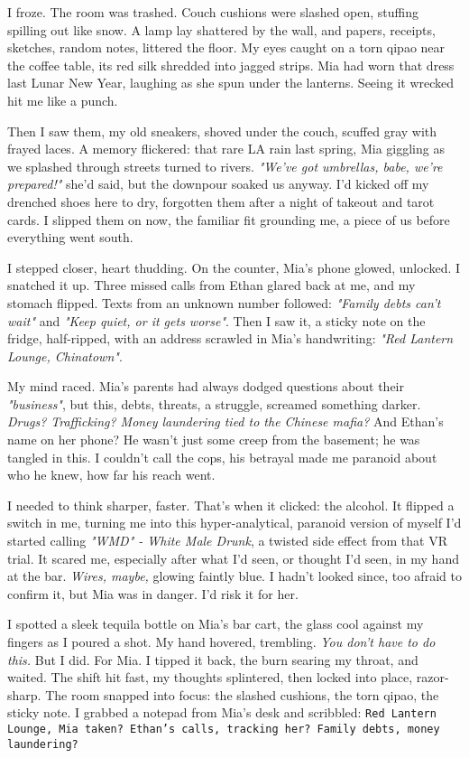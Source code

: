 \documentclass[12pt,oneside]{book}
\newcommand{\note}[1]{\texttt{#1}}
\begin{document}
I froze. The room was trashed. Couch cushions were slashed open, stuffing spilling out like snow. A lamp lay shattered by the wall, and papers, receipts, sketches, random notes, littered the floor. My eyes caught on a torn qipao near the coffee table, its red silk shredded into jagged strips. Mia had worn that dress last Lunar New Year, laughing as she spun under the lanterns. Seeing it wrecked hit me like a punch.

Then I saw them, my old sneakers, shoved under the couch, scuffed gray with frayed laces. A memory flickered: that rare LA rain last spring, Mia giggling as we splashed through streets turned to rivers. \textit{"We’ve got umbrellas, babe, we’re prepared!"} she’d said, but the downpour soaked us anyway. I’d kicked off my drenched shoes here to dry, forgotten them after a night of takeout and tarot cards. I slipped them on now, the familiar fit grounding me, a piece of us before everything went south.

I stepped closer, heart thudding. On the counter, Mia’s phone glowed, unlocked. I snatched it up. Three missed calls from Ethan glared back at me, and my stomach flipped. Texts from an unknown number followed: \textit{"Family debts can’t wait"} and \textit{"Keep quiet, or it gets worse"}. Then I saw it, a sticky note on the fridge, half-ripped, with an address scrawled in Mia’s handwriting: \textit{"Red Lantern Lounge, Chinatown"}.

My mind raced. Mia’s parents had always dodged questions about their \textit{"business"}, but this, debts, threats, a struggle, screamed something darker. \textit{Drugs? Trafficking? Money laundering tied to the Chinese mafia?} And Ethan’s name on her phone? He wasn’t just some creep from the basement; he was tangled in this. I couldn’t call the cops, his betrayal made me paranoid about who he knew, how far his reach went.

I needed to think sharper, faster. That’s when it clicked: the alcohol. It flipped a switch in me, turning me into this hyper-analytical, paranoid version of myself I’d started calling \textit{"WMD" - White Male Drunk}, a twisted side effect from that VR trial. It scared me, especially after what I’d seen, or thought I’d seen, in my hand at the bar. \textit{Wires, maybe,} glowing faintly blue. I hadn’t looked since, too afraid to confirm it, but Mia was in danger. I’d risk it for her.

I spotted a sleek tequila bottle on Mia’s bar cart, the glass cool against my fingers as I poured a shot. My hand hovered, trembling. \textit{You don’t have to do this.} But I did. For Mia. I tipped it back, the burn searing my throat, and waited. The shift hit fast, my thoughts splintered, then locked into place, razor-sharp. The room snapped into focus: the slashed cushions, the torn qipao, the sticky note. I grabbed a notepad from Mia’s desk and scribbled: \note{Red Lantern Lounge, Mia taken? Ethan’s calls, tracking her? Family debts, money laundering?}
\end{document}
